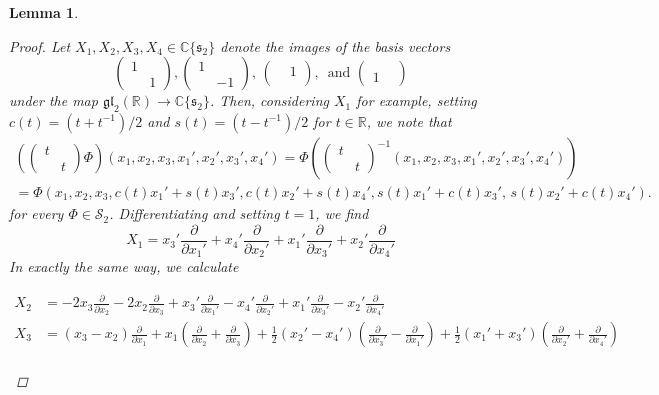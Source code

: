 \documentclass[reqno, 11pt]{amsart} %
\numberwithin{equation}{section}
\theoremstyle{plain}
\newtheorem{lemma}[theorem]{Lemma}
\theoremstyle{definition}
\theoremstyle{remark}
\newcommand{\bbC}{\mathbb C}
\newcommand{\bbR}{\mathbb R}
\newcommand{\lie}[1]{ \mathfrak{#1}}
\begin{document}
\begin{lemma}
	\begin{proof} Let $X_1, X_2, X_3, X_4 \in \bbC\{ \lie{s}_2\}$ denote the images of the basis vectors
\[
\begin{pmatrix} 1 & \\ & 1 \end{pmatrix} , \begin{pmatrix}1 & \\ & -1 \end{pmatrix} , \, \begin{pmatrix} & 1 \\ & \end{pmatrix} , \, \text{ and } \begin{pmatrix} & \\ 1 & \end{pmatrix}
\]
under the map $\lie{gl}_2(\bbR) \to \bbC\{ \lie s_2\}$. Then, considering $X_1$ for example, setting $c(t) = (t+t^{-1})/2$ and $s(t) = (t - t^{-1})/2$ for $t \in \bbR$, we note that
\begin{multline*}
\left(\left(\begin{smallmatrix} t & \\ & t\end{smallmatrix}\right) Φ \right)(x_1, x_2, x_3, x_1', x_2', x_3', x_4')  = Φ(\left(\begin{smallmatrix} t & \\ & t\end{smallmatrix}\right)^{-1}(x_1, x_2, x_3, x_1', x_2', x_3', x_4'))\\
= Φ(x_1, x_2, x_3, c(t) x_1' + s(t) x_3', c(t) x_2' + s(t) x_4' , s(t)x_1' + c(t) x_3', \, s(t) x_2' + c(t) x_4').
\end{multline*}
for every $Φ \in \mathcal S_2$. Differentiating and setting $t = 1$, we find
\[
X_1 =  x_3' \frac{\partial}{\partial x_1'} + x_4' \frac{\partial}{\partial x_2' } + x_1' \frac{\partial }{\partial x_3'} + x_2' \frac{\partial }{\partial x_4'}
\]
In exactly the same way, we calculate
\begin{small}
\begin{align*}
X_2 &= -2 x_3 \frac{\partial}{\partial x_2} -2 x_2 \frac{\partial}{\partial x_3} + x_3' \frac{\partial}{\partial x_1'} -  x_4' \frac{\partial}{\partial x_2'} +  x_1' \frac{\partial}{\partial x_3'} -   x_2' \frac{\partial}{\partial x_4'} \\
X_3 &= (x_3 - x_2) \frac{\partial}{\partial x_1} + x_1 \left( \frac{\partial}{\partial x_2} + \frac{\partial}{\partial x_3} \right) + \frac12 \left( x_2 '- x_4' \right) \left( \frac{\partial}{\partial x_3'} - \frac{\partial}{\partial x_1'} \right) + \frac12 \left( x_1' + x_3' \right)\left( \frac{\partial}{\partial x_2' } + \frac{\partial}{\partial x_4'}\right) \\

\end{align*}
\end{small}
\end{proof}
\end{lemma}
\end{document}
